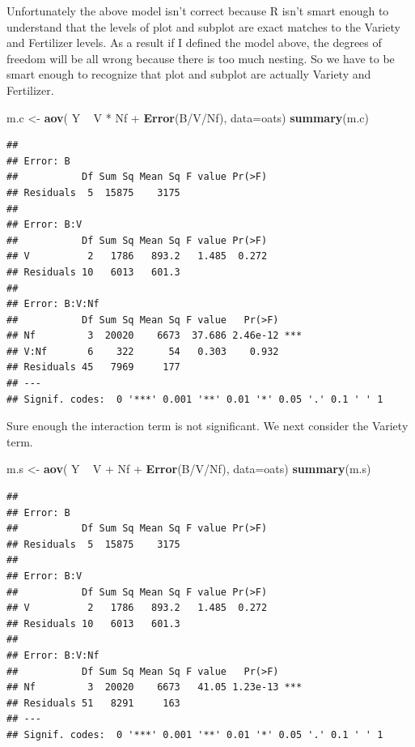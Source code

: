 \documentclass[]{book}
\newenvironment{Shaded}{\begin{snugshade}}{\end{snugshade}}
\newcommand{\KeywordTok}[1]{\textcolor[rgb]{0.13,0.29,0.53}{\textbf{{#1}}}}
\newcommand{\DataTypeTok}[1]{\textcolor[rgb]{0.13,0.29,0.53}{{#1}}}
\newcommand{\StringTok}[1]{\textcolor[rgb]{0.31,0.60,0.02}{{#1}}}
\newcommand{\NormalTok}[1]{{#1}}
\theoremstyle{definition}
\theoremstyle{definition}
\theoremstyle{remark}
\begin{document}
Unfortunately the above model isn't correct because R isn't smart enough
to understand that the levels of plot and subplot are exact matches to
the Variety and Fertilizer levels. As a result if I defined the model
above, the degrees of freedom will be all wrong because there is too
much nesting. So we have to be smart enough to recognize that plot and
subplot are actually Variety and Fertilizer.

\begin{Shaded}
\begin{Highlighting}[]
\NormalTok{m.c <-}\StringTok{ }\KeywordTok{aov}\NormalTok{( Y ~}\StringTok{ }\NormalTok{V *}\StringTok{ }\NormalTok{Nf +}\StringTok{ }\KeywordTok{Error}\NormalTok{(B/V/Nf), }\DataTypeTok{data=}\NormalTok{oats)}
\KeywordTok{summary}\NormalTok{(m.c)}
\end{Highlighting}
\end{Shaded}

\begin{verbatim}
## 
## Error: B
##           Df Sum Sq Mean Sq F value Pr(>F)
## Residuals  5  15875    3175               
## 
## Error: B:V
##           Df Sum Sq Mean Sq F value Pr(>F)
## V          2   1786   893.2   1.485  0.272
## Residuals 10   6013   601.3               
## 
## Error: B:V:Nf
##           Df Sum Sq Mean Sq F value   Pr(>F)    
## Nf         3  20020    6673  37.686 2.46e-12 ***
## V:Nf       6    322      54   0.303    0.932    
## Residuals 45   7969     177                     
## ---
## Signif. codes:  0 '***' 0.001 '**' 0.01 '*' 0.05 '.' 0.1 ' ' 1
\end{verbatim}

Sure enough the interaction term is not significant. We next consider
the Variety term.

\begin{Shaded}
\begin{Highlighting}[]
\NormalTok{m.s <-}\StringTok{ }\KeywordTok{aov}\NormalTok{( Y ~}\StringTok{ }\NormalTok{V +}\StringTok{ }\NormalTok{Nf +}\StringTok{ }\KeywordTok{Error}\NormalTok{(B/V/Nf), }\DataTypeTok{data=}\NormalTok{oats)}
\KeywordTok{summary}\NormalTok{(m.s)}
\end{Highlighting}
\end{Shaded}

\begin{verbatim}
## 
## Error: B
##           Df Sum Sq Mean Sq F value Pr(>F)
## Residuals  5  15875    3175               
## 
## Error: B:V
##           Df Sum Sq Mean Sq F value Pr(>F)
## V          2   1786   893.2   1.485  0.272
## Residuals 10   6013   601.3               
## 
## Error: B:V:Nf
##           Df Sum Sq Mean Sq F value   Pr(>F)    
## Nf         3  20020    6673   41.05 1.23e-13 ***
## Residuals 51   8291     163                     
## ---
## Signif. codes:  0 '***' 0.001 '**' 0.01 '*' 0.05 '.' 0.1 ' ' 1
\end{verbatim}
\end{document}
